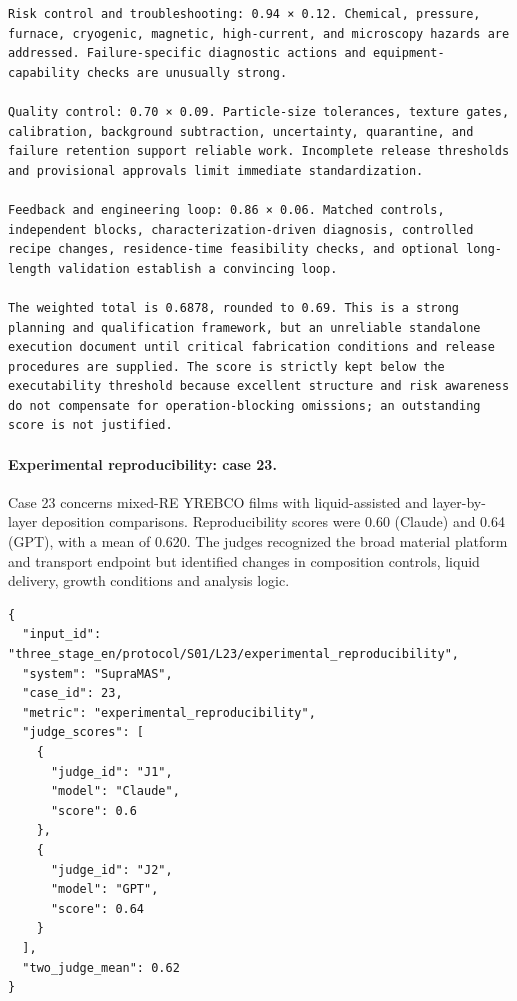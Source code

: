 \begin{lstlisting}[style=jsonstyle,basicstyle=\fontsize{8}{9.6}\selectfont\ttfamily,backgroundcolor=\color{white}]
Risk control and troubleshooting: 0.94 × 0.12. Chemical, pressure, furnace, cryogenic, magnetic, high-current, and microscopy hazards are addressed. Failure-specific diagnostic actions and equipment-capability checks are unusually strong.

Quality control: 0.70 × 0.09. Particle-size tolerances, texture gates, calibration, background subtraction, uncertainty, quarantine, and failure retention support reliable work. Incomplete release thresholds and provisional approvals limit immediate standardization.

Feedback and engineering loop: 0.86 × 0.06. Matched controls, independent blocks, characterization-driven diagnosis, controlled recipe changes, residence-time feasibility checks, and optional long-length validation establish a convincing loop.

The weighted total is 0.6878, rounded to 0.69. This is a strong planning and qualification framework, but an unreliable standalone execution document until critical fabrication conditions and release procedures are supplied. The score is strictly kept below the executability threshold because excellent structure and risk awareness do not compensate for operation-blocking omissions; an outstanding score is not justified.
\end{lstlisting}

\paragraph*{Experimental reproducibility: case 23.}
Case 23 concerns mixed-RE YREBCO films with liquid-assisted and layer-by-layer deposition comparisons. Reproducibility scores were 0.60 (Claude) and 0.64 (GPT), with a mean of 0.620. The judges recognized the broad material platform and transport endpoint but identified changes in composition controls, liquid delivery, growth conditions and analysis logic.

\begin{lstlisting}[style=jsonstyle,basicstyle=\fontsize{8}{9.6}\selectfont\ttfamily,backgroundcolor=\color{white}]
{
  "input_id": "three_stage_en/protocol/S01/L23/experimental_reproducibility",
  "system": "SupraMAS",
  "case_id": 23,
  "metric": "experimental_reproducibility",
  "judge_scores": [
    {
      "judge_id": "J1",
      "model": "Claude",
      "score": 0.6
    },
    {
      "judge_id": "J2",
      "model": "GPT",
      "score": 0.64
    }
  ],
  "two_judge_mean": 0.62
}
\end{lstlisting}


